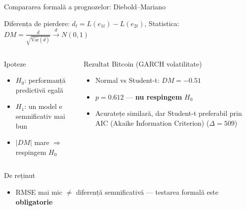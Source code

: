 \documentclass[9pt, aspectratio=169, t]{beamer}
\begin{document}
\begin{frame}{Compararea formală a prognozelor: Diebold--Mariano}
    \vspace{-0.2cm}
    \begin{defn}
        Diferența de pierdere: $d_t = L(e_{1t}) - L(e_{2t})$, \quad Statistica: $DM = \frac{\bar{d}}{\sqrt{\widehat{\text{Var}}(\bar{d})}} \xrightarrow{d} N(0,1)$
    \end{defn}

    \vspace{-0.1cm}

    \begin{columns}[T]
        \begin{block}{Ipoteze}
            \begin{itemize}\setlength{\itemsep}{0pt}
                \item $H_0$: performanță predictivă egală
                \item $H_1$: un model e semnificativ mai bun
                \item $|DM|$ mare $\Rightarrow$ respingem $H_0$
            \end{itemize}
        \end{block}

        \begin{exampleblock}{Rezultat Bitcoin (GARCH volatilitate)}
            \begin{itemize}\setlength{\itemsep}{0pt}
                \item Normal vs Student-t: $DM = -0.51$
                \item $p = 0.612$ --- \textbf{nu respingem} $H_0$
                \item Acuratețe similară, dar Student-t preferabil prin AIC (Akaike Information Criterion) ($\Delta = 509$)
            \end{itemize}
        \end{exampleblock}
    \end{columns}

    \vspace{0.1cm}

    \begin{alertblock}{De reținut}
        \begin{itemize}\setlength{\itemsep}{0pt}
            \item RMSE mai mic $\neq$ diferență semnificativă --- testarea formală este \textbf{obligatorie}
        \end{itemize}
    \end{alertblock}
\end{frame}
\end{document}

